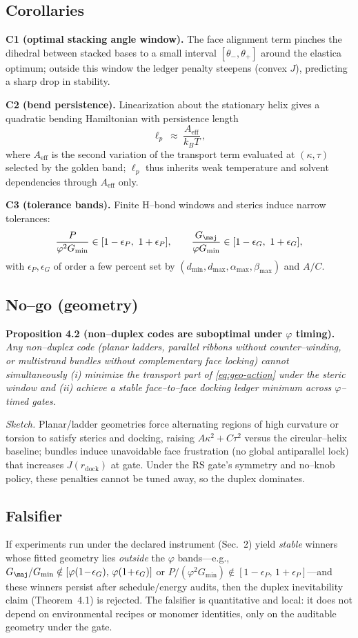 \documentclass[11pt]{article}
\begin{document}
\subsection{Corollaries}
\textbf{C1 (optimal stacking angle window).} The face alignment term pinches the dihedral between stacked bases to a small interval $[\theta_-,\theta_+]$ around the elastica optimum; outside this window the ledger penalty steepens (convex $J$), predicting a sharp drop in stability.

\noindent\textbf{C2 (bend persistence).} Linearization about the stationary helix gives a quadratic bending Hamiltonian with persistence length
\[
\ell_p\ \approx\ \frac{A_{\mathrm{eff}}}{k_B T}\,,
\]
where $A_{\mathrm{eff}}$ is the second variation of the transport term evaluated at $(\kappa,\tau)$ selected by the golden band; $\ell_p$ thus inherits weak temperature and solvent dependencies through $A_{\mathrm{eff}}$ only.

\noindent\textbf{C3 (tolerance bands).} Finite H–bond windows and sterics induce narrow tolerances:
\[
\frac{P}{\varphi^2 G_{\min}} \in [1-\epsilon_P,\ 1+\epsilon_P],\qquad
\frac{G_{\maj}}{\varphi G_{\min}} \in [1-\epsilon_G,\ 1+\epsilon_G],
\]
with $\epsilon_{P},\epsilon_{G}$ of order a few percent set by $(d_{\min},d_{\max},\alpha_{\max},\beta_{\max})$ and $A/C$.

\subsection{No–go (geometry)}
\textbf{Proposition 4.2 (non–duplex codes are suboptimal under $\varphi$ timing).}
\emph{Any non–duplex code (planar ladders, parallel ribbons without counter–winding, or multistrand bundles without complementary face locking) cannot simultaneously (i) minimize the transport part of \eqref{eq:geo-action} under the steric window and (ii) achieve a stable face–to–face docking ledger minimum across $\varphi$–timed gates.} 

\emph{Sketch.} Planar/ladder geometries force alternating regions of high curvature or torsion to satisfy sterics and docking, raising $A\kappa^2+C\tau^2$ versus the circular–helix baseline; bundles induce unavoidable face frustration (no global antiparallel lock) that increases $J(r_{\mathrm{dock}})$ at gate. Under the RS gate’s symmetry and no–knob policy, these penalties cannot be tuned away, so the duplex dominates.

\subsection{Falsifier}
If experiments run under the declared instrument (Sec.~2) yield \emph{stable} winners whose fitted geometry lies \emph{outside} the $\varphi$ bands—e.g., $G_{\maj}/G_{\min}\notin[\varphi(1\!-\!\epsilon_G),\,\varphi(1\!+\!\epsilon_G)]$ or $P/(\varphi^2 G_{\min})\notin[1\!-\!\epsilon_P,\,1\!+\!\epsilon_P]$—and these winners persist after schedule/energy audits, then the duplex inevitability claim (Theorem~4.1) is rejected. The falsifier is quantitative and local: it does not depend on environmental recipes or monomer identities, only on the auditable geometry under the gate.
\end{document}

